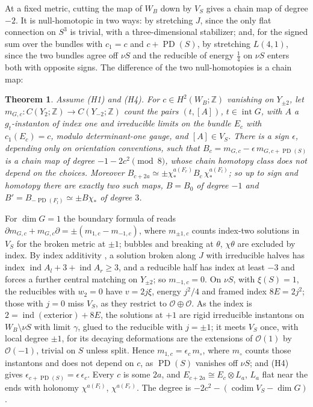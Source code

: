 \documentclass[10pt]{amsart}
\makeatletter
\numberwithin{equation}{section}
\theoremstyle{compact}
\newtheorem{theorem}{Theorem}[section]
\renewenvironment{proof}[1][\proofname]{\par\pushQED{\qed}\normalfont
  \topsep4\p@\relax\trivlist\item[\hskip\labelsep\itshape#1\@addpunct{.}]%
  \ignorespaces}{\popQED\endtrivlist\@endpefalse}
\newcommand{\Z}{\mathbb Z}
\newcommand{\PD}{\operatorname{PD}}
\newcommand{\cO}{\mathcal O}
\makeatother
\begin{document}
At a fixed metric, cutting the map of $W_B$ down by $V_S$ gives a chain map of
degree $-2$. It is null-homotopic in two ways: by stretching $J$, since the
only flat connection on $S^3$ is trivial, with a three-dimensional stabilizer;
and, for the signed sum over the bundles with $c_1=c$ and $c+\PD(S)$, by
stretching $L(4,1)$, since the two bundles agree off $\nu S$ and the reducible
of energy $\frac14$ on $\nu S$ enters both with opposite signs. The difference
of the two null-homotopies is a chain map:

\begin{theorem}\label{thm:B}
Assume \textup{(H1)} and \textup{(H4)}. For $c\in H^2(W_B;\Z)$ vanishing on
$Y_{\pm2}$, let $m_{G,c}\colon C(Y_2;\Z)\to C(Y_{-2};\Z)$ count the pairs
$(t,[A])$, $t\in\operatorname{int}G$, with $A$ a $g_t$-instanton of index one
and irreducible limits on the bundle $E_c$ with $c_1(E_c)=c$, modulo
determinant-one gauge, and $[A]\in V_S$. There is a sign $\epsilon$, depending
only on orientation conventions, such that $B_c=m_{G,c}-\epsilon\,m_{G,c+\PD(S)}$
is a chain map of degree $-1-2c^2\pmod 8$, whose chain homotopy class does not
depend on the choices. Moreover $B_{c+2a}\simeq\pm\chi_*^{a(F_r)}B_c\,
\chi_*^{a(F_l)}$; so up to sign and homotopy there are exactly two such maps,
$B=B_0$ of degree $-1$ and $B'=B_{-\PD(F_l)}\simeq\pm B\chi_*$ of degree $3$.
\end{theorem}

\begin{proof}[Sketch]
For $\dim G=1$ the boundary formula of \cite[\S3.9]{KM11} reads $\partial
m_{G,c}+m_{G,c}\partial=\pm(m_{1,c}-m_{-1,c})$, where $m_{\pm1,c}$ counts
index-two solutions in $V_S$ for the broken metric at $\pm1$; bubbles and
breaking at $\theta$, $\chi\theta$ are excluded by index. By index additivity
\cite[proof of Prop.~3.4]{DLME}, a solution broken along $J$ with irreducible
halves has index $\operatorname{ind}A_l+3+\operatorname{ind}A_r\ge3$, and a
reducible half has index at least $-3$ \cite[Lemma~5.6]{DLME} and forces a
further central matching on $Y_{\pm2}$; so $m_{-1,c}=0$. On $\nu S$, with
$\xi(S)=1$, the reducibles with $w_2=0$ have $v=2j\xi$, energy $j^2/4$ and
framed index $8E=2j^2$; those with $j=0$ miss $V_S$, as they restrict to
$\cO\oplus\cO$. As the index is $2=\operatorname{ind}(\text{exterior})+8E$, the
solutions at $+1$ are rigid irreducible instantons on $W_B\setminus\nu S$ with
limit $\gamma$, glued to the reducible with $j=\pm1$; it meets $V_S$ once, with
local degree $\pm1$, for its decaying deformations are the extensions of
$\cO(1)$ by $\cO(-1)$, trivial on $S$ unless split. Hence $m_{1,c}=\epsilon_c\,
m_\circ$, where $m_\circ$ counts those instantons and does not depend on $c$, as
$\PD(S)$ vanishes off $\nu S$; and (H4) gives $\epsilon_{c+\PD(S)}=
\epsilon\,\epsilon_c$. Every $c$ is some $2a$, and $E_{c+2a}\cong E_c\otimes
L_a$, $L_a$ flat near the ends with holonomy $\chi^{a(F_l)}$, $\chi^{a(F_r)}$. The
degree is $-2c^2-(\operatorname{codim}V_S-\dim G)$.
\end{proof}
\end{document}
